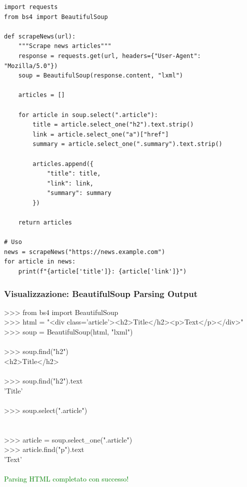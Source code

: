 \begin{lstlisting}
import requests
from bs4 import BeautifulSoup

def scrapeNews(url):
    """Scrape news articles"""
    response = requests.get(url, headers={"User-Agent": "Mozilla/5.0"})
    soup = BeautifulSoup(response.content, "lxml")

    articles = []

    for article in soup.select(".article"):
        title = article.select_one("h2").text.strip()
        link = article.select_one("a")["href"]
        summary = article.select_one(".summary").text.strip()

        articles.append({
            "title": title,
            "link": link,
            "summary": summary
        })

    return articles

# Uso
news = scrapeNews("https://news.example.com")
for article in news:
    print(f"{article['title']}: {article['link']}")
\end{lstlisting}

\subsubsection{Visualizzazione: BeautifulSoup Parsing Output}

\begin{center}
\begin{tcolorbox}[title=Terminal Output: BeautifulSoup parsing, colback=black!5, coltitle=white, colbacktitle=purple!50!black, width=0.95\textwidth, fonttitle=\bfseries\ttfamily, fontupper=\small\ttfamily]
>>> from bs4 import BeautifulSoup\\
>>> html = "<div class='article'><h2>Title</h2><p>Text</p></div>"\\
>>> soup = BeautifulSoup(html, "lxml")\\
\\
>>> soup.find("h2")\\
<h2>Title</h2>\\
\\
>>> soup.find("h2").text\\
'Title'\\
\\
>>> soup.select(".article")\\
[<div class="article"><h2>Title</h2><p>Text</p></div>]\\
\\
>>> article = soup.select\_one(".article")\\
>>> article.find("p").text\\
'Text'\\
\\
\textcolor{green}{Parsing HTML completato con successo!}
\end{tcolorbox}
\end{center}

